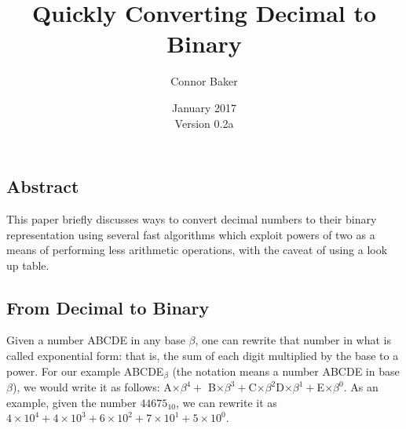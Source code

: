 \documentclass[12pt]{article}
\begin{document}

\null
\nointerlineskip
\vfill
\let \snewpage \newpage
\let \newpage \relax
\title{Quickly Converting Decimal to Binary}
\author{Connor Baker}
\date{January 2017\\Version 0.2a}
\maketitle

\begin{center}
  \subsection*{Abstract}
\end{center}
This paper briefly discusses ways to convert decimal numbers to their binary representation using several fast algorithms which exploit powers of two as a means of performing less arithmetic operations, with the caveat of using a look up table.

\let \newpage \snewpage
\vfill
\thispagestyle{empty}


\newpage %



\makeatletter
{}
\makeatother
\tableofcontents

\clearpage
{}



\newpage %



\begin{center}
  \section{From Decimal to Binary}
\end{center}
Given a number ABCDE in any base $\beta$, one can rewrite that number in what is called exponential form: that is, the sum of each digit multiplied by the base to a power. For our example ABCDE$_{\beta}$ (the notation means a number ABCDE in base $\beta$), we would write it as follows: A$\times\beta^4 +$ B$\times\beta^3 + $C$\times\beta^2 $D$\times\beta^1 + $E$\times\beta^0$. As an example, given the number $44675_{10}$, we can rewrite it as $4\times10^4 + 4\times10^3 + 6\times10^2 + 7\times10^1 + 5\times10^0$.
\end{document}
